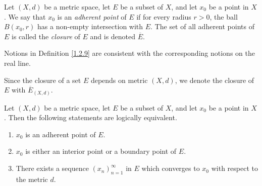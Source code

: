 \begin{definition}[Closure]\label{1.2.9}
    Let \((X, d)\) be a metric space, let \(E\) be a subset of \(X\), and let \(x_0\) be a point in \(X\).
    We say that \(x_0\) is an \emph{adherent point} of \(E\) if for every radius \(r > 0\), the ball \(B(x_0, r)\) has a non-empty intersection with \(E\).
    The set of all adherent points of \(E\) is called the \emph{closure} of \(E\) and is denoted \(\overline{E}\).
\end{definition}

\begin{note}
    Notions in Definition \ref{1.2.9} are consistent with the corresponding notions on the real line.
\end{note}

\begin{note}
    Since the closure of a set \(E\) depends on metric \((X, d)\), we denote the closure of \(E\) with \(\overline{E}_{(X, d)}\).
\end{note}

\begin{proposition}\label{1.2.10}
    Let \((X, d)\) be a metric space, let \(E\) be a subset of \(X\), and let \(x_0\) be a point in \(X\).
    Then the following statements are logically equivalent.
    \begin{enumerate}
        \item \(x_0\) is an adherent point of \(E\).
        \item \(x_0\) is either an interior point or a boundary point of \(E\).
        \item There exists a sequence \((x_n)_{n = 1}^\infty\) in \(E\) which converges to \(x_0\) with respect to the metric \(d\).
    \end{enumerate}
\end{proposition}

